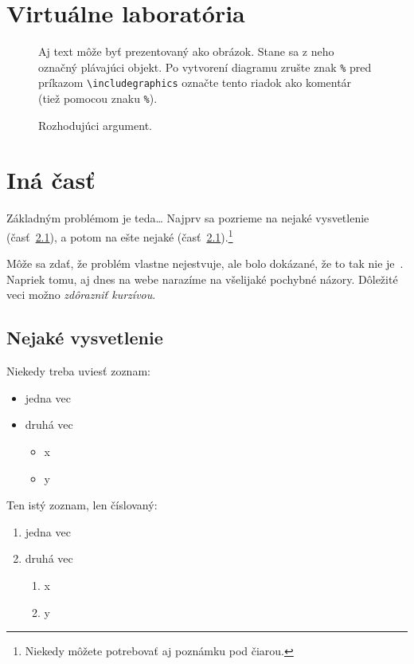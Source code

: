 \documentclass[10pt,twoside,slovak,a4paper]{article}
\begin{document}
\section {Virtuálne laboratória}

\begin{figure*}[tbh]
\centering
Aj text môže byť prezentovaný ako obrázok. Stane sa z neho označný plávajúci objekt. Po vytvorení diagramu zrušte znak \texttt{\%} pred príkazom \verb|\includegraphics| označte tento riadok ako komentár (tiež pomocou znaku \texttt{\%}).
\caption{Rozhodujúci argument.}
\label{f:rozhod}
\end{figure*}



\section{Iná časť} \label{ina}

Základným problémom je teda\ldots{} Najprv sa pozrieme na nejaké vysvetlenie (časť~\ref{ina:nejake}), a potom na ešte nejaké (časť~\ref{ina:nejake}).\footnote{Niekedy môžete potrebovať aj poznámku pod čiarou.}

Môže sa zdať, že problém vlastne nejestvuje\cite{Coplien:MPD}, ale bolo dokázané, že to tak nie je~\cite{Czarnecki:Staged, Czarnecki:Progress}. Napriek tomu, aj dnes na webe narazíme na všelijaké pochybné názory\cite{PLP-Framework}. Dôležité veci možno \emph{zdôrazniť kurzívou}.


\subsection{Nejaké vysvetlenie} \label{ina:nejake}

Niekedy treba uviesť zoznam:

\begin{itemize}
\item jedna vec
\item druhá vec
	\begin{itemize}
	\item x
	\item y
	\end{itemize}
\end{itemize}

Ten istý zoznam, len číslovaný:

\begin{enumerate}
\item jedna vec
\item druhá vec
	\begin{enumerate}
	\item x
	\item y
	\end{enumerate}
\end{enumerate}
\end{document}
